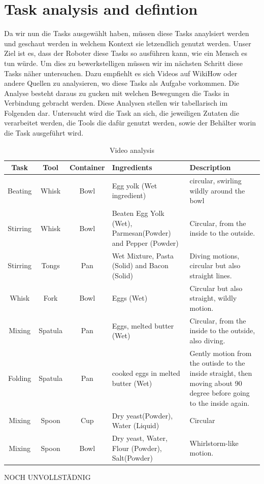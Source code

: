   \section*{Task analysis and defintion}
  Da wir nun die Tasks ausgewählt haben, müssen diese Tasks anaylsiert werden und geschaut werden in welchem Kontext sie letzendlich genutzt werden. Unser Ziel ist es, dass der Roboter diese Tasks so ausführen kann, wie ein Mensch es tun würde. Um dies zu bewerkstelligen müssen wir im nächsten Schritt diese Tasks näher untersuchen. Dazu empfiehlt es sich Videos auf WikiHow oder andere Quellen zu analysieren, wo diese Tasks als Aufgabe vorkommen. Die Analyse besteht daraus zu gucken mit welchen Bewegungen die Tasks in Verbindung gebracht werden. Diese Analysen stellen wir tabellarisch im Folgenden dar. Untersucht wird die Task an sich, die jeweiligen Zutaten die verarbeitet werden, die Tools die dafür genutzt werden, sowie der Behälter worin die Task ausgeführt wird. 
  \begin{table}[H]
    \centering
    \begin{tabular}{|c|c|c|p{}|p{}|}
        \hline
        \textbf{Task} & \textbf{Tool} & \textbf{Container} & \textbf{Ingredients} & \textbf{Description} \\
        \hline
        Beating & Whisk & Bowl & Egg yolk (Wet ingredient) & circular, swirling wildly around the bowl \\
        \hline
        Stirring & Whisk & Bowl & Beaten Egg Yolk (Wet), Parmesan(Powder) and Pepper (Powder) & Circular, from the inside to the outside. \\
        \hline
        Stirring & Tongs & Pan & Wet Mixture, Pasta (Solid) and Bacon (Solid) & Diving motions, circular but also straight lines. \\
        \hline
        Whisk & Fork & Bowl & Eggs (Wet) & Circular but also straight, wildly motion. \\
        \hline
        Mixing & Spatula & Pan & Eggs, melted butter (Wet) & Circular, from the inside to the outside, also diving. \\
        \hline
        Folding & Spatula & Pan & cooked eggs in melted butter (Wet) & Gently motion from the outisde to the inside straight, then moving about 90 degree before going to the inside again. \\
        \hline
        Mixing & Spoon & Cup & Dry yeast(Powder), Water (Liquid) & Circular \\
        \hline
        Mixing & Spoon & Bowl & Dry yeast, Water, Flour (Powder), Salt(Powder) & Whirlstorm-like motion. \\
        \hline 
    \end{tabular}
    \caption{Video analysis}
    \label{tab:example}
  \end{table}
NOCH UNVOLLSTÄDNIG

